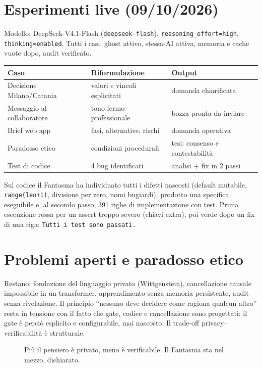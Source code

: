 \documentclass[11pt,a4paper]{article}
\begin{document}
\section{Esperimenti live (09/10/2026)}
Modello: DeepSeek-V4.1-Flash (\texttt{deepseek-flash}), \texttt{reasoning\_effort=high},
\texttt{thinking=enabled}. Tutti i casi: ghost attivo, stessa-AI attiva,
memoria e cache vuote dopo, audit verificato.

\begin{center}
\begin{tabular}{lll}
\toprule
Caso & Riformulazione & Output \\
\midrule
Decisione Milano/Catania & valori e vincoli esplicitati & domanda chiarificata \\
Messaggio al collaboratore & tono fermo-professionale & bozza pronta da inviare \\
Brief web app & fasi, alternative, rischi & domanda operativa \\
Paradosso etico & condizioni procedurali & tesi: consenso e contestabilit\`a \\
Test di codice & 4 bug identificati & analisi + fix in 2 passi \\
\bottomrule
\end{tabular}
\end{center}

Sul codice il Fantasma ha individuato tutti i difetti nascosti (default mutabile,
\texttt{range(len+1)}, divisione per zero, nomi bugiardi), prodotto una specifica
eseguibile e, al secondo passo, 391 righe di implementazione con test. Prima esecuzione
rossa per un assert troppo severo (chiavi extra), poi verde dopo un fix di una riga:
\texttt{Tutti i test sono passati.}

\section{Problemi aperti e paradosso etico}
Restano: fondazione del linguaggio privato (Wittgenstein), cancellazione causale
impossibile in un transformer, apprendimento senza memoria persistente, audit senza
rivelazione. Il principio ``nessuno deve decidere come ragiona qualcun altro'' resta
in tensione con il fatto che gate, codice e cancellazione sono progettati: il gate
\`e perci\`o esplicito e configurabile, mai nascosto. Il trade-off privacy--verificabilit\`a
\`e strutturale.

\begin{figure}[h]
\centering
{}
\caption{Pi\`u il pensiero \`e privato, meno \`e verificabile. Il Fantasma sta nel mezzo, dichiarato.}
\end{figure}
\end{document}
